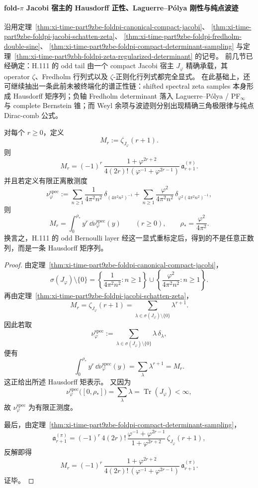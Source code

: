 \paragraph{fold-\texorpdfstring{$\pi$}{pi} Jacobi 宿主的 Hausdorff 正性、Laguerre--P\'olya 刚性与纯点波迹}
沿用定理~\ref{thm:xi-time-part9zbe-foldpi-canonical-compact-jacobi}、
\ref{thm:xi-time-part9zbe-foldpi-jacobi-schatten-zeta}、
\ref{thm:xi-time-part9zbe-foldpi-fredholm-double-sine}、
\ref{thm:xi-time-part9zbe-foldpi-compact-determinant-sampling}
与定理~\ref{thm:xi-time-part9zbh-foldpi-zeta-regularized-determinant} 的记号。
前几节已经确定：H.111 的 odd tail 由一个 compact Jacobi 宿主 \(J_\varphi\) 精确承载，其 operator \(\zeta\)、Fredholm 行列式以及 \(\zeta\)-正则化行列式都完全显式。
在此基础上，还可继续抽出一条此前未被终端化的谱正性链：shifted spectral zeta samples 本身形成 Hausdorff 矩序列；负轴 Fredholm determinant 落入 Laguerre--P\'olya / PF\(_\infty\) 与 complete Bernstein 锥；而 Weyl 余项与波迹则分别出现精确三角极限律与纯点 Dirac-comb 公式。

\begin{theorem}\label{thm:xi-time-part9zbj-shifted-spectral-zeta-hausdorff}
对每个 \(r\ge 0\)，定义
\[
M_r:=\zeta_{J_\varphi}(r+1).
\]
则
\[
M_r
=
(-1)^r\,
\frac{1+\varphi^{2r+2}}
{4(2r)!\,(\varphi^{-1}+\varphi^{2r-1})}
\,
\mathfrak a_{r+1}^{(\pi)}.
\]
并且若定义有限正离散测度
\[
\nu_\varphi^{\mathrm{spec}}
:=
\sum_{n\ge 1}\frac{1}{4\pi^2n^2}\,
\delta_{(4\pi^2n^2)^{-1}}
+
\sum_{n\ge 1}\frac{\varphi^2}{4\pi^2n^2}\,
\delta_{\varphi^2(4\pi^2n^2)^{-1}},
\]
则
\[
M_r=\int_0^{\rho_\ast} y^r\,\dd\nu_\varphi^{\mathrm{spec}}(y)
\qquad (r\ge 0),
\qquad
\rho_\ast=\frac{\varphi^2}{4\pi^2}.
\]
换言之，H.111 的 odd Bernoulli layer 经这一显式重标定后，得到的不是任意正数列，而是一条 Hausdorff 矩序列。
\end{theorem}
\begin{proof}
由定理~\ref{thm:xi-time-part9zbe-foldpi-canonical-compact-jacobi}，
\[
\sigma(J_\varphi)\setminus\{0\}
=
\left\{\frac{1}{4\pi^2n^2}:n\ge 1\right\}
\cup
\left\{\frac{\varphi^2}{4\pi^2n^2}:n\ge 1\right\}.
\]
再由定理~\ref{thm:xi-time-part9zbe-foldpi-jacobi-schatten-zeta}，
\[
M_r=\zeta_{J_\varphi}(r+1)
=
\sum_{\lambda\in \sigma(J_\varphi)\setminus\{0\}}\lambda^{r+1}.
\]
因此若取
\[
\nu_\varphi^{\mathrm{spec}}
:=
\sum_{\lambda\in \sigma(J_\varphi)\setminus\{0\}}\lambda\,\delta_\lambda,
\]
便有
\[
\int_0^{\rho_\ast} y^r\,\dd\nu_\varphi^{\mathrm{spec}}(y)
=
\sum_{\lambda}\lambda^{r+1}
=
M_r.
\]
这正给出所述 Hausdorff 矩表示。
又因为
\[
\nu_\varphi^{\mathrm{spec}}\bigl([0,\rho_\ast]\bigr)
=
\sum_{\lambda}\lambda
=
\operatorname{Tr}(J_\varphi)<\infty,
\]
故 \(\nu_\varphi^{\mathrm{spec}}\) 为有限正测度。

最后，由定理~\ref{thm:xi-time-part9zbe-foldpi-compact-determinant-sampling}，
\[
\mathfrak a_{r+1}^{(\pi)}
=
(-1)^r\,
4(2r)!\,
\frac{\varphi^{-1}+\varphi^{2r-1}}{1+\varphi^{2r+2}}\,
\zeta_{J_\varphi}(r+1),
\]
反解即得
\[
M_r
=
(-1)^r\,
\frac{1+\varphi^{2r+2}}
{4(2r)!\,(\varphi^{-1}+\varphi^{2r-1})}
\,
\mathfrak a_{r+1}^{(\pi)}.
\]
证毕。
\end{proof}


